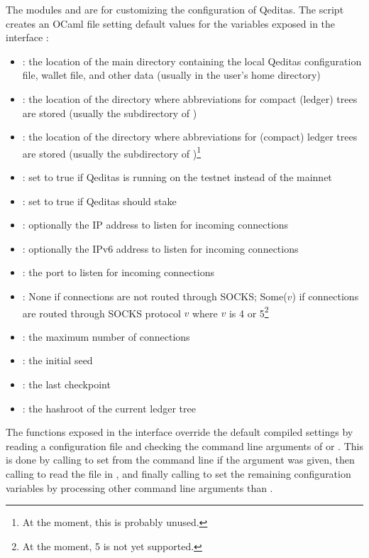 The modules  and 
are for customizing the configuration of Qeditas.
The  script creates an OCaml file 
setting default values for the variables exposed in the interface :
\begin{itemize}
\item {} : the location of the main directory containing the local Qeditas configuration file, wallet file, and other data (usually  in the user's home directory)
\item {} : the location of the directory where abbreviations for compact (ledger) trees are stored (usually the  subdirectory of )
\item {} : the location of the directory where abbreviations for (compact) ledger trees are stored (usually the  subdirectory of )\footnote{At the moment, this is probably unused.}
\item {} : set to true if Qeditas is running on the testnet instead of the mainnet
\item {} : set to true if Qeditas should stake
\item {} : optionally the IP address to listen for incoming connections
\item {} : optionally the IPv6 address to listen for incoming connections
\item {} : the port to listen for incoming connections
\item {} : None if connections are not routed through SOCKS; Some($v$) if connections are routed through SOCKS protocol $v$ where $v$ is 4 or 5\footnote{At the moment, 5 is not yet supported.}
\item {} : the maximum number of connections
\item {} : the initial seed
\item {} : the last checkpoint
\item {} : the hashroot of the current ledger tree
\end{itemize}

The functions exposed in the interface 
override the default compiled settings by reading a configuration file
and checking the command line arguments of  or .
This is done by calling 
to set  from the command line if the argument  was given,
then calling  to read the  file in ,
and finally calling  to set the remaining configuration variables
by processing other command line arguments than .

